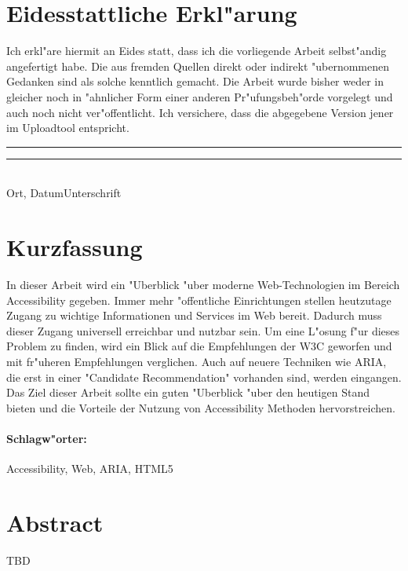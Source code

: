 \documentclass[a4paper,bibtotoc,oneside]{scrbook}
\begin{document}
\newpage


\section*{Eidesstattliche Erkl"arung}\thispagestyle{empty}
\glqq Ich erkl"are hiermit an Eides statt, dass ich die vorliegende Arbeit selbst"andig angefertigt habe. 
Die aus fremden Quellen direkt oder indirekt "ubernommenen Gedanken sind als solche kenntlich gemacht. 
Die Arbeit wurde bisher weder in gleicher noch in "ahnlicher Form einer anderen Pr"ufungsbeh"orde vorgelegt
und auch noch nicht ver"offentlicht. Ich versichere, dass die abgegebene Version jener im Uploadtool entspricht.\grqq\\[5\baselineskip]
\rule{5cm}{0.2pt}\hfill\rule{5cm}{0.2pt}\\
\phantom{Datum }Ort, Datum\hfill Unterschrift\hspace{15mm}

\newpage


\section*{Kurzfassung}\thispagestyle{empty}
In dieser Arbeit wird ein "Uberblick "uber moderne Web-Technologien im Bereich
Accessibility gegeben. Immer mehr "offentliche Einrichtungen stellen heutzutage
Zugang zu wichtige Informationen und Services im Web bereit. Dadurch muss dieser
Zugang universell erreichbar und nutzbar sein. Um eine L"osung f"ur dieses
Problem zu finden, wird ein Blick auf die Empfehlungen der W3C geworfen und mit
fr"uheren Empfehlungen verglichen. Auch auf neuere Techniken wie ARIA, die erst
in einer "Candidate Recommendation" vorhanden sind, werden eingangen. Das Ziel
dieser Arbeit sollte ein guten "Uberblick "uber den heutigen Stand bieten und
die Vorteile der Nutzung von Accessibility Methoden hervorstreichen. 
\\ \vfill
\paragraph*{Schlagw"orter:} Accessibility, Web, ARIA, HTML5


\newpage

\section*{Abstract}\thispagestyle{empty}
TBD
\\ \vfill
\end{document}
